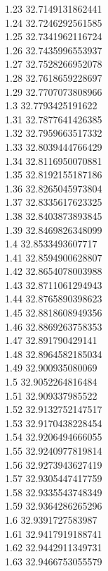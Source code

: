 {1.23	32.7149131862441\\
1.24	32.7246292561585\\
1.25	32.7341962116724\\
1.26	32.7435996553937\\
1.27	32.7528266952078\\
1.28	32.7618659228697\\
1.29	32.7707073808966\\
1.3	32.7793425191622\\
1.31	32.7877641426385\\
1.32	32.7959663517332\\
1.33	32.8039444766429\\
1.34	32.8116950070881\\
1.35	32.8192155187186\\
1.36	32.8265045973804\\
1.37	32.8335617623325\\
1.38	32.8403873893845\\
1.39	32.8469826348099\\
1.4	32.8533493607717\\
1.41	32.8594900628807\\
1.42	32.8654078003988\\
1.43	32.8711061294943\\
1.44	32.8765890398623\\
1.45	32.8818608949356\\
1.46	32.8869263758353\\
1.47	32.891790429141\\
1.48	32.8964582185034\\
1.49	32.900935080069\\
1.5	32.9052264816484\\
1.51	32.909337985522\\
1.52	32.9132752147517\\
1.53	32.9170438228454\\
1.54	32.9206494666055\\
1.55	32.9240977819814\\
1.56	32.9273943627419\\
1.57	32.9305447417759\\
1.58	32.9335543748349\\
1.59	32.9364286265296\\
1.6	32.9391727583987\\
1.61	32.9417919188741\\
1.62	32.9442911349731\\
1.63	32.9466753055579\\
}
